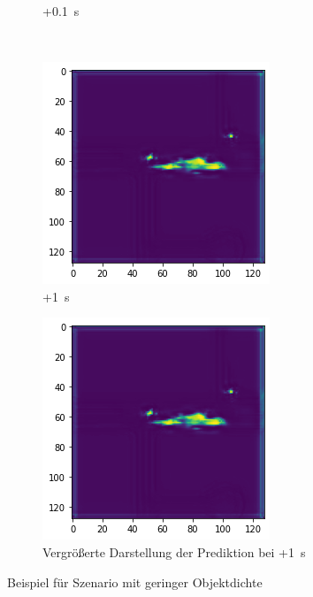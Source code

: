 \documentclass[12pt]{article}
\begin{document}
\begin{figure}[H]
\begin{subfigure}[b]{0.18\textwidth}
                \caption{+0.1~s}
            \end{subfigure}
            ~
            \begin{subfigure}[b]{0.18\textwidth}
                \includegraphics[width=\textwidth]{output_low_dens_4.png}
                \caption{+1~s}
            \end{subfigure}
            \vspace{1cm}
            \begin{subfigure}[b]{0.6\textwidth}
                \includegraphics[width=\textwidth]{output_low_dens_4.png}
                \caption{Vergrößerte Darstellung der Prediktion bei +1~s}
            \end{subfigure}
            \caption{Beispiel für Szenario mit geringer Objektdichte}\label{fig:out_low_dens}
        \end{figure}
\end{document}
